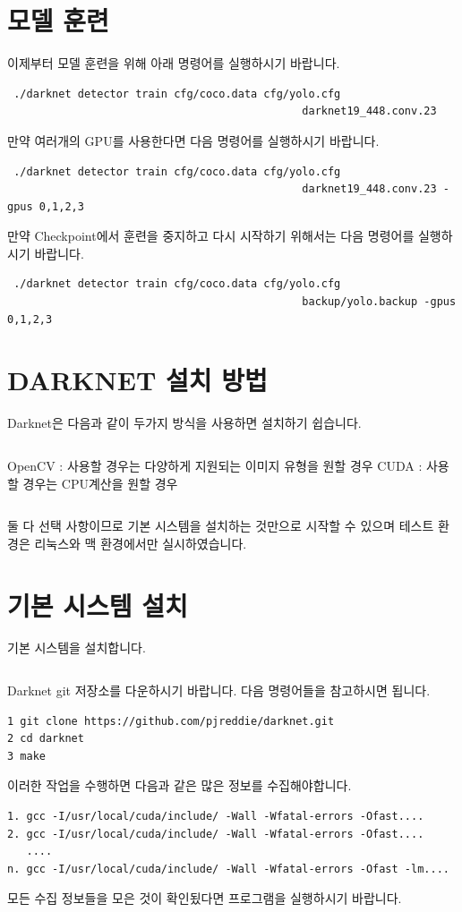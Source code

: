 \documentclass{article}
\begin{document}
\section{모델 훈련}
이제부터 모델 훈련을 위해 아래 명령어를 실행하시기 바랍니다.
\begin{lstlisting}
 ./darknet detector train cfg/coco.data cfg/yolo.cfg 
                                              darknet19_448.conv.23 
\end{lstlisting}
만약 여러개의 GPU를 사용한다면 다음 명령어를 실행하시기 바랍니다.
\begin{lstlisting}
 ./darknet detector train cfg/coco.data cfg/yolo.cfg 
                                              darknet19_448.conv.23 -gpus 0,1,2,3 
\end{lstlisting}
만약 Checkpoint에서 훈련을 중지하고 다시 시작하기 위해서는 다음 명령어를 실행하시기 바랍니다.
\begin{lstlisting}
 ./darknet detector train cfg/coco.data cfg/yolo.cfg 
                                              backup/yolo.backup -gpus 0,1,2,3
\end{lstlisting}


\section{DARKNET 설치 방법}
Darknet은 다음과 같이 두가지 방식을 사용하면 설치하기 쉽습니다.
\begin{lstlisting}

\end{lstlisting} 
OpenCV : 사용할 경우는 다양하게 지원되는 이미지 유형을 원할 경우
\newline CUDA : 사용할 경우는 CPU계산을 원할 경우


\begin{lstlisting}

\end{lstlisting} 
둘 다 선택 사항이므로 기본 시스템을 설치하는 것만으로 시작할 수 있으며 테스트 환경은 리눅스와 맥 환경에서만 실시하였습니다.

\section{기본 시스템 설치}
기본 시스템을 설치합니다. 

\begin{lstlisting}

\end{lstlisting}
Darknet git 저장소를  다운하시기 바랍니다. 다음 명령어들을 참고하시면 됩니다.
\begin{lstlisting}
1 git clone https://github.com/pjreddie/darknet.git 
2 cd darknet 
3 make 
\end{lstlisting}
이러한 작업을 수행하면 다음과 같은 많은 정보를 수집해야합니다.
\begin{lstlisting}
1. gcc -I/usr/local/cuda/include/ -Wall -Wfatal-errors -Ofast.... 
2. gcc -I/usr/local/cuda/include/ -Wall -Wfatal-errors -Ofast.... 
   .... 
n. gcc -I/usr/local/cuda/include/ -Wall -Wfatal-errors -Ofast -lm.... 
\end{lstlisting}
모든 수집 정보들을 모은 것이 확인됬다면 프로그램을 실행하시기 바랍니다.
\end{document}
